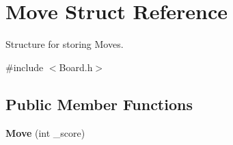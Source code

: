 \hypertarget{structMove}{}\section{Move Struct Reference}
\label{structMove}


Structure for storing Moves.  




{\ttfamily \#include $<$Board.\+h$>$}

\subsection*{Public Member Functions}
\begin{DoxyCompactItemize}
\item 
{\bfseries Move} (int \+\_\+score)\hypertarget{structMove_a22dbf6a4cdc5bf0f15eef7b1fcfbae8e}{}\label{structMove_a22dbf6a4cdc5bf0f15eef7b1fcfbae8e}

\end{DoxyCompactItemize}
